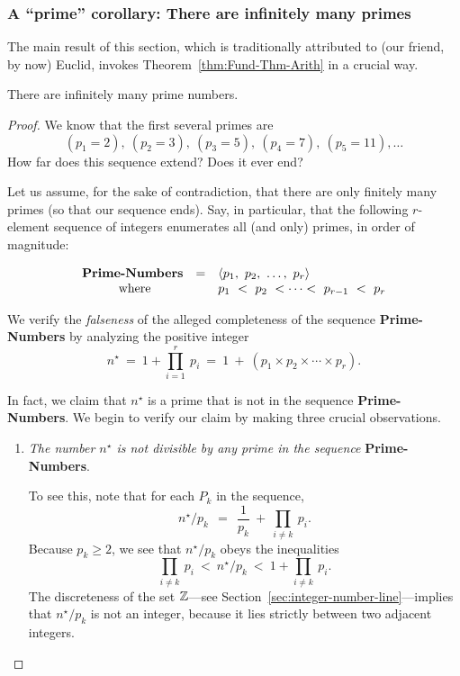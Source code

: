 \subsubsection{A ``prime'' corollary: There are infinitely many primes}
\label{sec:infinite-primes}

The main result of this section, which is traditionally attributed to (our friend, by now) Euclid, invokes Theorem~\ref{thm:Fund-Thm-Arith} in a crucial way.

\begin{prop}
\label{thm:infinite-primes}
There are infinitely many prime numbers.
\end{prop}

\begin{proof}
We know that the first several primes are
\[ (p_1 =2), \ (p_2 = 3), \ (p_3 =5), \ (p_4 = 7), \ (p_5 =11), \ldots \] 
How far does this sequence extend?  Does it ever end?

\medskip

Let us assume, for the sake of contradiction, that there are only finitely many primes (so that our sequence ends).  Say, in particular, that the following $r$-element sequence of integers enumerates all (and only) primes, in order of magnitude:

\smallskip

\[ \begin{array}{ccl}
\mbox{\bf Prime-Numbers} & = & 
\langle p_1, \ p_2, \ \ldots, \ p_r \rangle \\
\mbox{ where} &  &
p_1 \ < \ p_2 \ < \cdots < \ p_{r-1} \ < \ p_r
\end{array}
\]

\smallskip

We verify the {\em falseness} of the alleged completeness of the sequence {\bf Prime-Numbers} by analyzing the positive integer
\[
n^\star \ = \ 1 + \prod_{i=1}^r \ p_i \ = \ 1 \ + \ \left(p_1 \times p_2 \times \cdots \times p_r \right).
\]

In fact, we claim that $n^\star$ is a prime that is not in the sequence {\bf Prime-Numbers}.  We begin to verify our claim by making three crucial observations.
\begin{enumerate}
\item
{\em The number $n^\star$ is not divisible by any prime in the sequence} {\bf Prime-Numbers}.

\smallskip

To see this, note that for each $P_k$ in the sequence,
\[
n^\star / p_k \ \ = \ \ \frac{1}{p_k} \ + \ \prod_{i \neq k} \ p_i .
\]
Because $p_k \geq 2$, we see that $n^\star / p_k$ obeys the inequalities
\[
\prod_{i \neq k} \ p_i \ < \ n^\star /p_k \ < \ 1 + \prod_{i \neq k} \ p_i.
\] 
The discreteness of the set $\mathbb{Z}$---see Section~\ref{sec:integer-number-line}---implies that $n^\star / p_k$ is not an integer, because it lies strictly between two adjacent integers.


\end{enumerate}
\end{proof}

